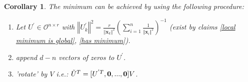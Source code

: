 \documentclass{article}
\newtheorem{corollary}{Corollary}
\newtheorem{lemma}[theorem]{Lemma}
\newcommand{\probref}[1]{Problem~\ref{#1}}
\newcommand{\claimref}[1]{claim~\ref{#1}}
\newcommand{\x}{{\mathbf x}}
\begin{document}

\begin{corollary}
The minimum can be achieved by using the following procedure:
\begin{enumerate}
    \item Let $U^{'}\in\mathcal{O}^{n\times r}$ with $\left\Vert U^{'}_k\right\Vert^2=\frac{r}{\left\Vert \x_{k}\right\Vert^{2}}\left({\sum_{i=1}^n \frac{1}{\left\Vert \x_{i}\right\Vert^{2}}}\right)^{-1}$ (exist by claims \ref{local minimum is global}, \ref{has minimum}).
    \item append $d-n$ vectors of zeros to $U^{'}$.
    \item 'rotate' by $V$ i.e.: ${\Tilde{U}}^T=[U^{'T},\textbf{0},...,\textbf{0}]V$.
\end{enumerate}
\end{corollary}
\end{document}
